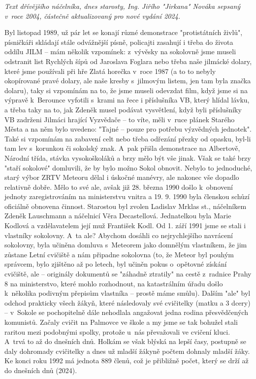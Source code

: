 \documentclass[a5paper, 11pt, twoside]{article}
\begin{document}
\textit{Text dřívějšího náčelníka, dnes starosty, Ing. Jiřího "Jirkana"
Nováka sepsaný v~roce 2004, částečně aktualizovaný pro nové vydání
2024.}

Byl listopad 1989, už pár let se konají různé demonstrace "protistátních
živlů", písničkáři skládají stále odvážnější písně, policajti zasahují
i třeba do života oddílu JILM -- mám několik vzpomínek: z~vývěsky na
sokolovně jsme museli odstranit list Rychlých šípů od Jaroslava Foglara
nebo třeba naše jilmácké dolary, které jsme používali při hře Zlatá
horečka v~roce 1987 (a to to nebyly okopírované pravé dolary, ale naše
kresby s~jilmovým listem, jen tam byla značka dolaru), taky si vzpomínám
na to, že jsme museli odevzdat film, když jsme si na výpravě k~Berounce
vyfotili s~krami na řece i příslušníka VB, který hlídal lávku, a třeba
taky na to, jak Zdeněk musel podávat vysvětlení, když byli příslušníky
VB zadrženi Jilmáci hrající Vyzvědače -- to víte, měli v~ruce plánek
Starého Města a na něm bylo uvedeno: "Tajné -- pouze pro potřebu
výzvědných jednotek". Také si vzpomínám na zabavení celt nebo třeba
odřezání přezky od opasku, byl-li tam lev s~korunkou či sokolský znak.
A~pak přišla demonstrace na Albertově, Národní třída, stávka vysokoškoláků
a brzy mělo být vše jinak. Však se také brzy "staří sokolové"
domluvili, že by bylo možno Sokol obnovit. Nebylo to jednoduché, starý
výbor ZRTV Meteoru dělal i úskočné manévry, ale nakonec vše dopadlo
relativně dobře. Mělo to své ale, avšak již 28. března 1990 došlo
k~obnovení jednoty zaregistrováním na ministerstvu vnitra a 19. 9. 1990
byla členskou schůzí oficiálně obnovena činnost. Starostou byl zvolen
Ladislav Mrklas st., náčelníkem Zdeněk Lauschmann a náčelnicí Věra
Decastellová. Jednatelkou byla Marie Kodlová a vzdělavatelem její muž
František Kodl. Od 1. září 1991 jsme se stali i vlastníky sokolovny.
A~ta ale? Abychom dosáhli co nejrychlejšího navrácení sokolovny, byla
učiněna domluva s~Meteorem jako domnělým vlastníkem, že jim zůstane
Letní cvičiště a nám připadne sokolovna (to, že Meteor byl pouhým
správcem, bylo zjištěno až po letech, byl učiněn pokus o~opětovné
získání cvičiště, ale -- originály dokumentů se "záhadně ztratily" na
cestě z~radnice Prahy 8 na ministerstvo, které mohlo rozhodnout, na
katastrálním úřadu došlo k~několika podivným přepisům vlastníka --
prostě máme smůlu). Dalším "ale" byl odchod prakticky všech žákyň,
které následovaly své cvičitelky (matku a 3 dcery) -- v~Sokole se
pochopitelně dále nehodlala angažovat jedna rodina přesvědčených
komunistů. Začaly cvičit na Palmovce ve škole a my jsme se tak bohužel
stali raritou mezi podobnými spolky, protože u~nás převažovali ve
cvičení kluci. A~trvá to až do dnešních dnů. Holkám se však blýská na
lepší časy, postupně se daly dohromady cvičitelky a dnes už mladší
žákyně počtem dohnaly mladší žáky. Ke konci roku 1992 má jednota 889
členů, což je přibližně počet, který se drží až do dnešních dnů (2024).
\end{document}
